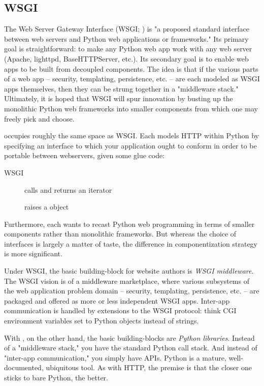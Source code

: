 \subsection{WSGI \label{wsgi}}

The Web Server Gateway Interface (WSGI; ) is "a proposed standard
interface between web servers and Python web applications or frameworks." Its
primary goal is straightforward: to make any Python web app work with any web
server (Apache, lighttpd, BaseHTTPServer, etc.). Its secondary goal is to enable
web apps to be built from decoupled components. The idea is that if the various
parts of a web app -- security, templating, persistence, etc. -- are each
modeled as WSGI apps themselves, then they can be strung together in a
"middleware stack." Ultimately, it is hoped that WSGI will spur innovation by
busting up the monolithic Python web frameworks into smaller components from
which one may freely pick and choose.

 occupies roughly the same space as WSGI. Each models HTTP within
Python by specifying an interface to which your application ought to conform in
order to be portable between webservers, given some glue code:

\begin{description}

\item[WSGI]
    { calls  and returns
    an iterator}

\item[]
    { raises a  object}

\end{description}


Furthermore, each wants to recast Python web programming in terms of smaller
components rather than monolithic frameworks. But whereas the choice of
interfaces is largely a matter of taste, the difference in componentization
strategy is more significant.

Under WSGI, the basic building-block for website authors is \emph{WSGI
middleware}. The WSGI vision is of a middleware marketplace, where various
subsystems of the web application problem domain -- security, templating,
persistence, etc. -- are packaged and offered as more or less independent WSGI
apps. Inter-app communication is handled by extensions to the WSGI protocol:
think CGI environment variables set to Python objects instead of strings.

With , on the other hand, the basic building-blocks are
\emph{Python libraries}. Instead of a "middleware stack," you have the standard
Python call stack. And instead of "inter-app communication," you simply have
APIs. Python is a mature, well-documented, ubiquitous tool. As with HTTP, the
premise is that the closer one sticks to bare Python, the better.
